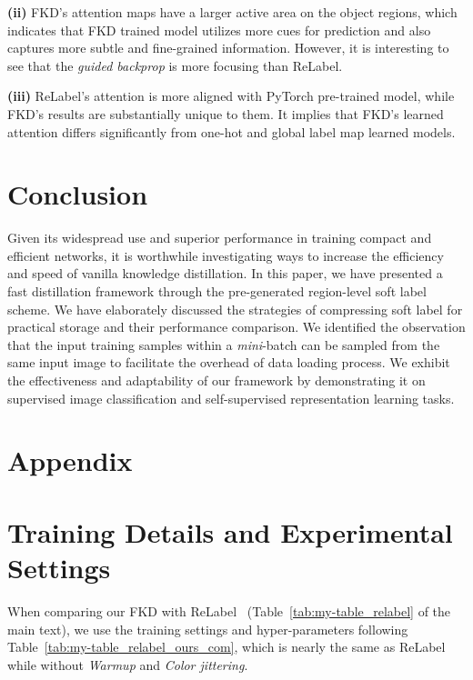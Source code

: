 \documentclass[10pt,twocolumn,letterpaper]{article}
\begin{document}
{\bf (ii)} FKD's attention maps have a larger active area on the object regions, which indicates that FKD trained model utilizes more cues for prediction and also captures more subtle and fine-grained information. However, it is interesting to see that the {\em guided backprop} is more focusing than ReLabel.

{\bf (iii)} ReLabel's attention is more aligned with PyTorch pre-trained model, while FKD's results are substantially unique to them. It implies that FKD's learned attention differs significantly from one-hot and global label map learned models.

\section{Conclusion}

Given its widespread use and superior performance in training compact and efficient networks, it is worthwhile investigating ways to increase the efficiency and speed of vanilla knowledge distillation. In this paper, we have presented a fast distillation framework through the pre-generated region-level soft label scheme. We have elaborately discussed the strategies of compressing soft label for practical storage and their performance comparison. We identified the observation that the input training samples within a {\em mini}-batch can be sampled from the same input image to facilitate the overhead of data loading process. We exhibit the effectiveness and adaptability of our framework by demonstrating it on supervised image classification and self-supervised representation learning tasks.

{\small
	
	
}

\newpage

\appendix

\section*{\Large{Appendix}}
\vspace{1ex}

\section{Training Details and Experimental Settings}

 When comparing our FKD with ReLabel~\cite{yun2021re} (Table~\ref{tab:my-table_relabel} of the main text), we use the training settings and hyper-parameters following Table~\ref{tab:my-table_relabel_ours_com}, which is nearly the same as ReLabel~\cite{yun2021re} while without {\em Warmup} and {\em Color jittering}.
\end{document}
